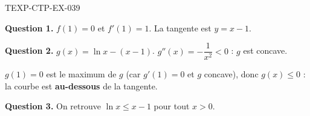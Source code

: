 \begin{corrige}{TEXP-CTP-EX-039}

\textbf{Question 1.} $f(1)=0$ et $f'(1)=1$. La tangente est $y = x - 1$.


\textbf{Question 2.} $g(x) = \ln x - (x-1)$. $g''(x) = -\dfrac{1}{x^2} < 0$ : $g$ est concave.

$g(1) = 0$ est le maximum de $g$ (car $g'(1) = 0$ et $g$ concave), donc $g(x) \leq 0$ : la courbe est \textbf{au-dessous} de la tangente.

\textbf{Question 3.} On retrouve $\ln x \leq x - 1$ pour tout $x > 0$.

\end{corrige}
